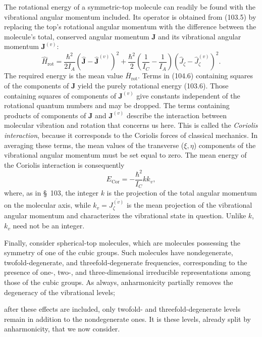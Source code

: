 The rotational energy of a symmetric-top molecule can readily be found with the vibrational angular momentum included. Its operator is obtained from (103.5) by replacing the top's rotational angular momentum with the difference between the molecule's total, conserved angular momentum $\mathbf J$ and its vibrational angular momentum $\mathbf J^{(v)}$:
\begin{equation}
 \widehat H_{\text{rot}}=\frac{\hbar^2}{2I_A}(\widehat{\mathbf J}-\widehat{\mathbf J}^{(v)})^2
 +\frac{\hbar^2}{2}\left(\frac1{I_C}-\frac1{I_A}\right)
 (\widehat J_\zeta-\widehat J_\zeta^{(v)})^2.
 \tag{104.6}
\end{equation}
The required energy is the mean value $\overline{H}_{\text{rot}}$. Terms in (104.6) containing squares of the components of $\mathbf J$ yield the purely rotational energy (103.6). Those containing squares of components of $\mathbf J^{(v)}$ give constants independent of the rotational quantum numbers and may be dropped. The terms containing products of components of $\mathbf J$ and $\mathbf J^{(v)}$ describe the interaction between molecular vibration and rotation that concerns us here. This is called the \emph{Coriolis interaction}, because it corresponds to the Coriolis forces of classical mechanics. In averaging these terms, the mean values of the transverse ($\xi,\eta$) components of the vibrational angular momentum must be set equal to zero. The mean energy of the Coriolis interaction is consequently
\begin{equation}
 E_{\text{Cor}}=-\frac{\hbar^2}{I_C}kk_v,
 \tag{104.7}
\end{equation}
where, as in §~103, the integer $k$ is the projection of the total angular momentum on the molecular axis, while $k_v=\overline{J_\zeta^{(v)}}$ is the mean projection of the vibrational angular momentum and characterizes the vibrational state in question. Unlike $k$, $k_v$ need not be an integer.

Finally, consider spherical-top molecules, which are molecules possessing the symmetry of one of the cubic groups. Such molecules have nondegenerate, twofold-degenerate, and threefold-degenerate frequencies, corresponding to the presence of one-, two-, and three-dimensional irreducible representations among those of the cubic groups. As always, anharmonicity partially removes the degeneracy of the vibrational levels;

after these effects are included, only twofold- and threefold-degenerate levels remain in addition to the nondegenerate ones. It is these levels, already split by anharmonicity, that we now consider.

